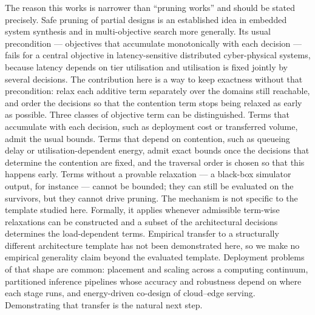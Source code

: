 \documentclass[pdflatex,sn-nature,lineno]{sn-jnl}
\begin{document}
The reason this works is narrower than ``pruning works'' and should be stated precisely.
Safe pruning of partial designs is an established idea in embedded system
synthesis\cite{neubauer2018exact,lukasiewycz2008symbolic} and in multi-objective search
more generally\cite{mandow2010namoa,paretopruning2022}. Its usual precondition ---
objectives that accumulate monotonically with each decision --- fails for a central objective in
latency-sensitive distributed cyber-physical systems, because latency depends on tier
utilisation and utilisation is fixed jointly by several decisions. The contribution here
is a way to keep exactness without that precondition: relax each additive term separately
over the domains still reachable, and order the decisions so that the contention term
stops being relaxed as early as possible. Three classes of objective term can be distinguished.
Terms that accumulate with each decision, such as deployment cost or transferred volume,
admit the usual bounds. Terms that depend on contention, such as queueing delay or
utilisation-dependent energy, admit exact bounds once the decisions that determine the
contention are fixed, and the traversal order is chosen so that this happens early. Terms
without a provable relaxation --- a black-box simulator output, for instance --- cannot be
bounded; they can still be evaluated on the survivors, but they cannot drive pruning.
The mechanism is not specific to the template
studied here. Formally, it applies whenever admissible term-wise relaxations can be constructed and a
subset of the architectural decisions determines the load-dependent terms. Empirical
transfer to a structurally different architecture template has not been demonstrated
here, so we make no empirical generality claim beyond the evaluated template. Deployment problems of that shape are common: placement and scaling
across a computing continuum\cite{filippini2026replica,predictive2026}, partitioned
inference pipelines whose accuracy and robustness depend on where each stage
runs\cite{guo2023,guo2025}, and energy-driven co-design of cloud--edge
serving\cite{cloud2026coopt}. Demonstrating that transfer is the natural next step.
\end{document}
